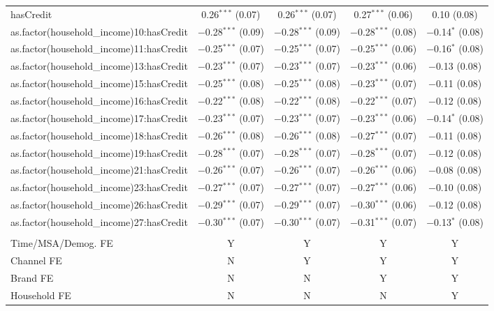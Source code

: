 \begin{table}[!htbp]
\begin{tabular}{@{\extracolsep{5pt}}lcccc}
  hasCredit & 0.26$^{***}$ (0.07) & 0.26$^{***}$ (0.07) & 0.27$^{***}$ (0.06) & 0.10 (0.08) \\ 
  as.factor(household\_income)10:hasCredit & $-$0.28$^{***}$ (0.09) & $-$0.28$^{***}$ (0.09) & $-$0.28$^{***}$ (0.08) & $-$0.14$^{*}$ (0.08) \\ 
  as.factor(household\_income)11:hasCredit & $-$0.25$^{***}$ (0.07) & $-$0.25$^{***}$ (0.07) & $-$0.25$^{***}$ (0.06) & $-$0.16$^{*}$ (0.08) \\ 
  as.factor(household\_income)13:hasCredit & $-$0.23$^{***}$ (0.07) & $-$0.23$^{***}$ (0.07) & $-$0.23$^{***}$ (0.06) & $-$0.13 (0.08) \\ 
  as.factor(household\_income)15:hasCredit & $-$0.25$^{***}$ (0.08) & $-$0.25$^{***}$ (0.08) & $-$0.23$^{***}$ (0.07) & $-$0.11 (0.08) \\ 
  as.factor(household\_income)16:hasCredit & $-$0.22$^{***}$ (0.08) & $-$0.22$^{***}$ (0.08) & $-$0.22$^{***}$ (0.07) & $-$0.12 (0.08) \\ 
  as.factor(household\_income)17:hasCredit & $-$0.23$^{***}$ (0.07) & $-$0.23$^{***}$ (0.07) & $-$0.23$^{***}$ (0.06) & $-$0.14$^{*}$ (0.08) \\ 
  as.factor(household\_income)18:hasCredit & $-$0.26$^{***}$ (0.08) & $-$0.26$^{***}$ (0.08) & $-$0.27$^{***}$ (0.07) & $-$0.11 (0.08) \\ 
  as.factor(household\_income)19:hasCredit & $-$0.28$^{***}$ (0.07) & $-$0.28$^{***}$ (0.07) & $-$0.28$^{***}$ (0.07) & $-$0.12 (0.08) \\ 
  as.factor(household\_income)21:hasCredit & $-$0.26$^{***}$ (0.07) & $-$0.26$^{***}$ (0.07) & $-$0.26$^{***}$ (0.06) & $-$0.08 (0.08) \\ 
  as.factor(household\_income)23:hasCredit & $-$0.27$^{***}$ (0.07) & $-$0.27$^{***}$ (0.07) & $-$0.27$^{***}$ (0.06) & $-$0.10 (0.08) \\ 
  as.factor(household\_income)26:hasCredit & $-$0.29$^{***}$ (0.07) & $-$0.29$^{***}$ (0.07) & $-$0.30$^{***}$ (0.06) & $-$0.12 (0.08) \\ 
  as.factor(household\_income)27:hasCredit & $-$0.30$^{***}$ (0.07) & $-$0.30$^{***}$ (0.07) & $-$0.31$^{***}$ (0.07) & $-$0.13$^{*}$ (0.08) \\ 
 \hline \\[-1.8ex] 
Time/MSA/Demog. FE & Y & Y & Y & Y \\ 
Channel FE & N & Y & Y & Y \\ 
Brand FE & N & N & Y & Y \\ 
Household FE & N & N & N & Y \\ 

\end{tabular}
\end{table}
